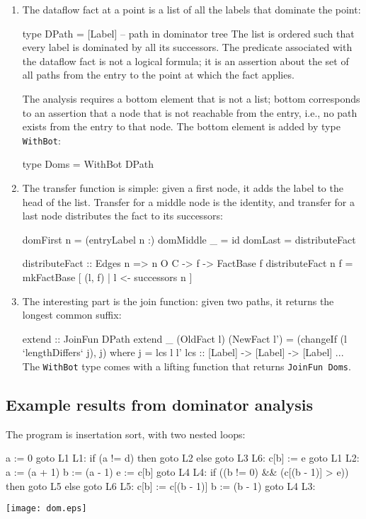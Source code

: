 \documentclass[twocolumn]{article}
\newenvironment{code}{\par\unskip\kern-6pt \small\verbatim}{\endverbatim}
\newenvironment{smallcode}{\par\unskip\footnotesize\verbatim}{\endverbatim}
\begin{document}
\begin{enumerate}
\item
The dataflow fact at a point is a list of all the labels that dominate
the point:
\begin{code}
type DPath = [Label] -- path in dominator tree
\end{code}
The list is ordered such that every label is dominated by all its
successors.
The predicate associated with the dataflow fact is not a logical
formula; it is an assertion about the set of all paths from the entry to
the point at which the fact applies.

The analysis requires a bottom element that is not a list;
bottom corresponds to an assertion that a node that is not reachable
from the entry, i.e., no path exists from the entry to that node.
The bottom element is added by type \texttt{WithBot}:
\begin{code}
type Doms = WithBot DPath
\end{code}
\item
The transfer function is simple: given a first node, it adds the label
to the head of the list.
Transfer for a middle node is the identity, and
transfer for a last node distributes the fact to its successors:
\begin{code}
domFirst n  = (entryLabel n :)
domMiddle _ = id
domLast     = distributeFact

distributeFact :: Edges n => n O C -> f -> FactBase f
distributeFact n f
  = mkFactBase [ (l, f) | l <- successors n ]
\end{code}
\item
The interesting part is the join function:
given two paths, it returns the longest common suffix:
\begin{code}
extend :: JoinFun DPath
extend _ (OldFact l) (NewFact l')
  = (changeIf (l `lengthDiffers` j), j)
 where j = lcs l l'
       lcs :: [Label] -> [Label] -> [Label]
       ...
\end{code}
The \texttt{WithBot} type comes with a lifting function that returns
\texttt{JoinFun~Doms}.
\end{enumerate}

\subsection{Example results from dominator analysis}

The program is insertation sort, with two nested loops:
\begin{smallcode}
  a := 0
  goto L1
L1:
  if (a != d) then goto L2 else goto L3
L6:
  c[b] := e
  goto L1
L2:
  a := (a + 1)
  b := (a - 1)
  e := c[b]
  goto L4
L4:
  if ((b != 0) && (c[(b - 1)] > e)) then goto L5 else goto L6
L5:
  c[b] := c[(b - 1)]
  b := (b - 1)
  goto L4
L3:
\end{smallcode}

\centerline{%
\texttt{[image: dom.eps]}%
}
\end{document}
